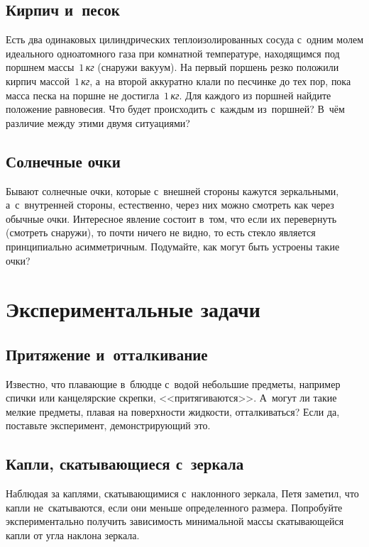\documentclass[a4paper,12pt]{article}
\newcommand\un[1]{\,\emph{#1}}
\begin{document}
\subsection{Кирпич и~песок}
Есть два одинаковых цилиндрических теплоизолированных сосуда с~одним молем идеального одноатомного газа
при комнатной температуре, находящимся под поршнем массы~$1$\un{кг} (снаружи вакуум). На первый поршень
резко положили кирпич массой~$1$\un{кг}, а~на второй аккуратно клали по песчинке до тех пор, пока масса
песка на поршне не достигла~$1$\un{кг}. Для каждого из поршней найдите положение равновесия. Что будет
происходить с~каждым из~поршней? В~чём различие между этими двумя ситуациями?


\subsection{Солнечные очки}
Бывают солнечные очки, которые с~внешней стороны кажутся зеркальными, а~с~внутренней стороны,
естественно, через них можно смотреть как через обычные очки. Интересное явление состоит в~том,
что если их перевернуть (смотреть снаружи), то почти ничего не видно, то есть стекло является
принципиально асимметричным. Подумайте, как могут быть устроены такие очки?

\section{Экспериментальные задачи}

\subsection{Притяжение и~отталкивание}

Известно, что плавающие в~блюдце с~водой небольшие предметы, например спички или канцелярские скрепки,
<<притягиваются>>. А~могут ли такие мелкие предметы, плавая на поверхности жидкости,
отталкиваться? Если да, поставьте эксперимент, демонстрирующий это.

\subsection{Капли, скатывающиеся с~зеркала}
Наблюдая за каплями, скатывающимися с~наклонного зеркала, Петя заметил, что капли не~скатываются,
если они меньше определенного размера. Попробуйте экспериментально получить зависимость минимальной
массы скатывающейся капли от угла наклона зеркала.
\end{document}
